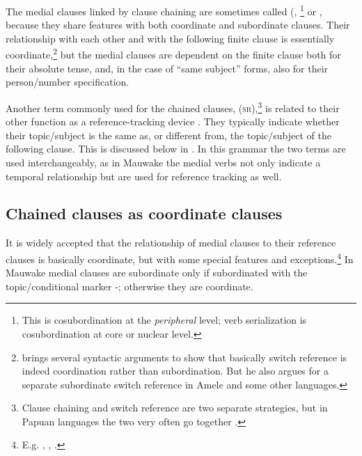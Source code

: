 The medial clauses linked by clause chaining are sometimes called  (\citealt{Olson1981}, \citealt[257]{FoleyEtAl1984} \footnote{This is cosubordination at the \textit{peripheral} level; verb serialization is cosubordination at core or nuclear level.} or  \citep[177]{Foley1986}, because they share features with both coordinate and subordinate clauses. Their relationship with each other and with the following finite clause is essentially coordinate,\footnote{\citet{Roberts1988a} brings several syntactic arguments to show that basically switch reference is indeed coordination rather than subordination. But he also argues for a separate subordinate switch reference in Amele and some other languages.} but the medial clauses are dependent on the finite clause both for their absolute tense, and, in the case of ``same subject'' forms, also for their person/number specification. 

Another term commonly used for the chained clauses,  (\textsc{sr}),\footnote{Clause chaining and switch reference are two separate strategies, but in Papuan languages the two very often  go together \citep[104]{Roberts1997}.} is related to their other function as a reference-tracking device \citep[ix]{HaimanEtAl1983}. They typically indicate whether their topic/subject is the same as, or different from, the topic/subject of the following clause. This is discussed below in . In this grammar the two terms are used interchangeably, as in Mauwake the medial verbs not only indicate a temporal relationship but are used for reference tracking as well.

\subsection{Chained clauses as coordinate clauses} \label{sec:8.2.1}

It is widely accepted that the relationship of medial clauses to their reference clauses is basically coordinate, but with some special features and exceptions.\footnote{E.g. \citet[175,193]{Reesink1987}, \citet[51]{Roberts1988a}, \citet[13]{Roberts1994}.} In Mauwake medial clauses are subordinate only if subordinated with the topic/conditional marker -; otherwise they are coordinate. 

